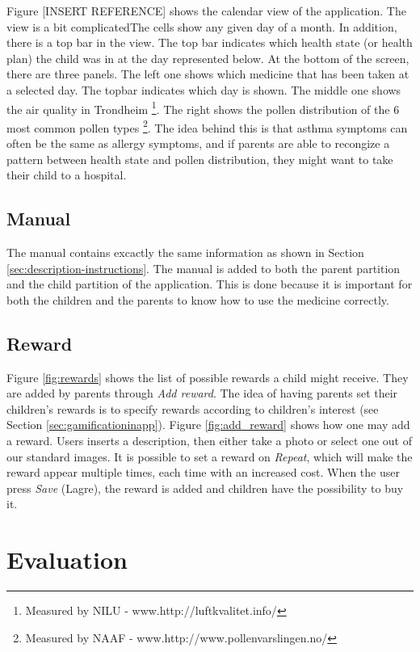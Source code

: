 Figure [INSERT REFERENCE] shows the calendar view of the application. The view is a bit complicatedThe cells show any given day of a month. In addition, there is a top bar in the view. The top bar indicates which health state (or health plan) the child was in at the day represented below. At the bottom of the screen, there are three panels. The left one shows which medicine that has been taken at a selected day. The topbar indicates which day is shown. The middle one shows the air quality in Trondheim \footnote{Measured by NILU - www.http://luftkvalitet.info/}. The right shows the pollen distribution of the 6 most common pollen types \footnote{Measured by NAAF - www.http://www.pollenvarslingen.no/}. The idea behind this is that asthma symptoms can often be the same as allergy symptoms, and if parents are able to recongize a pattern between health state and pollen distribution, they might want to take their child to a hospital.    


\subsection{Manual}
\label{sec:description-manual}
The manual contains excactly the same information as shown in Section \ref{sec:description-instructions}. The manual is added to both the parent partition and the child partition of the application. This is done because it is important for both the children and the parents to know how to use the medicine correctly. 


\subsection{Reward}
\label{sec:description-manage-rewards}
Figure \ref{fig:rewards} shows the list of possible rewards a child might receive. They are added by parents through \emph{Add reward}. The idea of having parents set their children's rewards is to specify rewards according to children's interest (see Section \ref{sec:gamificationinapp}). Figure \ref{fig:add_reward} shows how one may add a reward. Users inserts a description, then either take a photo or select one out of our standard images. It is possible to set a reward on \emph{Repeat}, which will make the reward appear multiple times, each time with an increased cost.        
When the user press \emph{Save} (Lagre), the reward is added and children have the possibility to buy it. 
 
 
\section{Evaluation}

